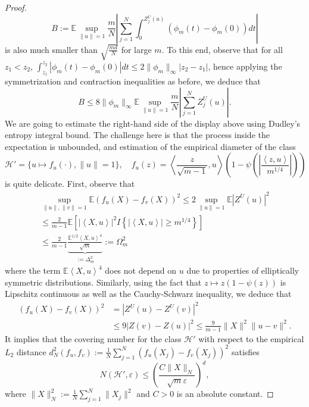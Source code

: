 \documentclass[12pt]{article}
\newcommand{\eps}{\varepsilon}
\def\l{\left}
\def\r{\right}
\newcommand{\m}{\mathcal}
\newcommand{\mb}{\mathbb}
\newcommand{\dotp}[2]{\left\langle#1,#2\right\rangle}
\theoremstyle{thmstyletwo}%
\theoremstyle{thmstylethree}%
\begin{document}
\begin{proof}
\begin{equation}
    \label{eq:B}
B:=\mb E\sup_{\|u\|=1} \frac{m}{N}\l| \sum_{j=1}^N \int_0^{Z^U_j(u)} (\phi_m(t) - \phi_m(0))dt\r|
\end{equation}
is also much smaller than $\sqrt{\frac{md}{N}}$ for large $m$. To this end, observe that for all $z_1<z_2$,  $\int_{z_1}^{z_2}\l| \phi_m(t) - \phi_m(0)\r| dt\leq 2\|\phi_m\|_\infty \l|z_2 - z_1\r|$, hence applying the symmetrization and contraction inequalities as before, we deduce that 
\[
B\leq 8\|\phi_m\|_\infty \mb E\sup_{\|u\|=1}\frac{m}{N}\l| \sum_{j=1}^N Z_j^U(u)\r|.
\]
We are going to estimate the right-hand side of the display above using Dudley's entropy integral bound. The challenge here is that the process inside the expectation is unbounded, and estimation of the empirical diameter of the class 
\[
\m H'=\{u\mapsto f_u(\cdot), \|u\|=1\}, \quad 
f_u(z) =  \dotp{\frac{z}{\sqrt{m-1}}}{u}\l(1-\psi\l(\l| \frac{\dotp{z}{u}}{m^{1/4}}\r|\r)\r)
\]
is quite delicate. First, observe that
\begin{multline*}
\sup_{\|u\|,\|v\|=1}\mb E (f_u(X) - f_v(X))^2
\leq 
2\sup_{\|u\|=1}\mb E|Z^U(u)|^2 
\\
\leq \frac{2}{m-1}\mb E \l[\l|\dotp{X}{u}\r|^2 I\l\{ |\dotp{X}{u}|\geq m^{1/4}\r\}\r]
\\
\leq \frac{2}{m-1}\underbrace{\frac{\mb E^{1/2}\dotp{X}{u}^4}{\sqrt m}}_{:=\Delta_m^2}
:=\Omega^2_m
\end{multline*}
where the term $\mb E\dotp{X}{u}^4$ does not depend on $u$ due to properties of elliptically symmetric distributions. 
Similarly, using the fact that $z\mapsto z(1-\psi(z))$ is Lipschitz continuous as well as the Cauchy-Schwarz inequality, we deduce that 
\begin{align*}
   \l(f_u(X) - f_v(X) \r)^2 &=\l| Z^U(u) - Z^U(v)\r|^2
   \\
    & \leq 9\l| Z(v) - Z(u)\r|^2 
    \leq \frac{9}{m-1}\|X\|^2\|u-v\|^2.
\end{align*}
It implies that the covering number for the class $\m H'$ with respect to the empirical $L_2$ distance $d_N^2(f_u,f_v):=\frac{1}{N}\sum_{j=1}^N \l(f_u(X_j) - f_v(X_j) \r)^2$ satisfies 
\[
N\l(\m H',\eps \r)\leq \l( \frac{C\|X\|_N}{\sqrt{m}\eps}\r)^d,
\]
where $\|X\|_N^2:=\frac{1}{N}\sum_{j=1}^N \|X_j\|^2$ and $C>0$ is an absolute constant. 

\end{proof}
\end{document}
